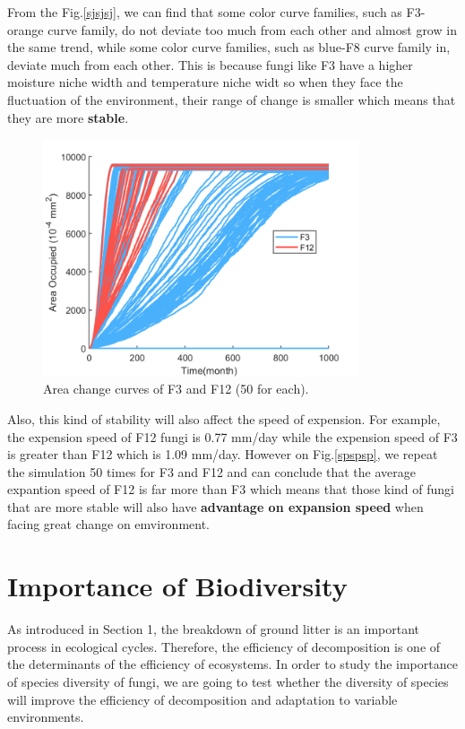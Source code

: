 \documentclass{mcmthesis}
\begin{document}
From the Fig.\eqref{sjsjsj}, we can find that some color curve families, such as F3-orange curve family, do not deviate too much from each other and almost grow in the same trend, while some color curve families, such as blue-F8 curve family in, deviate much from each other. This is because fungi like F3 have a higher moisture niche width and temperature niche widt so when they face the fluctuation of the environment, their range of change is smaller which means that they are more \textbf{stable}.
\begin{figure}[H] 
	\centering 
	\includegraphics[height=7cm]{./picture/3vs12.pdf}
	\caption{Area change curves of F3 and F12 (50 for each).}
	\label{spspsp}
\end{figure}
\par Also, this kind of stability will also affect the speed of expension. For example, the expension speed of F12 fungi is 0.77 mm/day while the expension speed of F3 is greater than F12 which is 1.09 mm/day. However on Fig.\eqref{spspsp}, we repeat the simulation 50 times for F3 and F12 and can conclude that the average expantion speed of F12 is far more than F3 which means that those kind of fungi that are more stable will also have \textbf{advantage on expansion speed} when facing great change on emvironment. 




\newpage


\section{Importance of Biodiversity}

\par As introduced in Section 1, the breakdown of ground litter is an important process in ecological cycles. Therefore, the efficiency of decomposition is one of the determinants of the efficiency of ecosystems. In order to study the importance of species diversity of fungi, we are going to test whether the diversity of species will improve the efficiency of decomposition and adaptation to variable environments.
\end{document}
